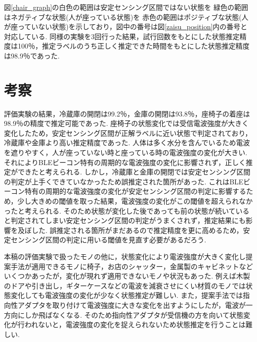 \documentclass[Japanese]{dicomopapers}
\begin{document}
図\ref{chair_graph}の白色の範囲は安定センシング区間ではない状態を 緑色の範囲はネガティブな状態(人が座っている状態)を 赤色の範囲はポジティブな状態(人が座っていない状態)を示しており，図中の番号は図\ref{zaisu_position}内の番号と対応している.
同様の実験を3回行った結果，試行回数をもとにした状態推定精度は100％，推定ラベルのうち正しく推定できた時間をもとにした状態推定精度は98.9％であった.


\section{考察}

評価実験の結果，冷蔵庫の開閉は99.2％，金庫の開閉は93.8％，座椅子の着座は98.9％の精度で推定可能であった.
座椅子の状態変化では受信電波強度が大きく変化したため，安定センシング区間が正解ラベルに近い状態で判定されており，冷蔵庫や金庫より高い推定精度であった.
人体は多く水分を含んでいるため電波を遮りやすく，人が座っていない時と座っている時の電波強度の変化が大きい.
それによりBLEビーコン特有の周期的な電波強度の変化に影響されず，正しく推定ができたと考えられる.
しかし，冷蔵庫と金庫の開閉では安定センシング区間の判定が上手くできていなかったため誤推定された箇所があった.
これはBLEビーコン特有の周期的な電波強度の変化が安定センシング区間の判定に影響するため，少し大きめの閾値を取った結果，電波強度の変化がこの閾値を超えられなかったと考えられる.
そのため状態が変化した後であっても前の状態が続いていると判定されてしまい安定センシング区間の判定がうまくされず，推定結果にも影響を及ぼした.
誤推定される箇所がまだあるので推定精度を更に高めるため，安定センシング区間の判定に用いる閾値を見直す必要があるだろう.

本稿の評価実験で扱ったモノの他に，状態変化により電波強度が大きく変化し提案手法が適用できるモノに椅子，お店のシャッター，金属製のキャビネットなどいくつかあったが，変化が現れず適用できないモノや状況もあった.
例えば木製のドアや引き出し，ギターケースなどの電波を減衰させにくい材質のモノでは状態変化しても電波強度の変化が少なく状態推定が難しい.
また，提案手法では指向性アダプタを取り付けて電波強度に大きな変化を出すようにしたが，電波が一方向にしか飛ばなくなる.
そのため指向性アダプタが受信機の方を向いて状態変化が行われないと，電波強度の変化を捉えられないため状態推定を行うことは難しい.
\end{document}
